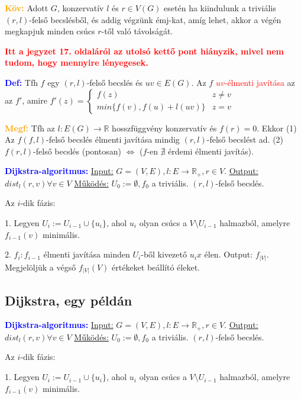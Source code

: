 \documentclass[12pt]{article}
\begin{document}
			\textbf{\textcolor{orange}{Köv:}} Adott $G$, konzervatív $l$ és $r \in V(G)$ esetén ha kiindulunk a triviális $(r,l)$-felső becslésből, és addig végzünk émj-kat, amíg lehet, akkor a végén megkapjuk minden csúcs $r$-től való távolságát.

			\textbf{\textcolor{red}{Itt a jegyzet 17. oldaláról az utolsó kettő pont hiányzik, mivel nem tudom, hogy mennyire lényegesek.}}

			\textbf{\textcolor{blue}{Def:}} Tfh $f$ egy $(r,l)$-felső becslés és $uv \in E(G)$. Az $f$ \textcolor{red}{$uv$-élmenti javítása} az az $f'$, amire 
			$
				f'(z) = \begin{cases}
					f(z) & z \neq v \\
					min\{f(v), f(u) + l(uv)\} & z = v
				\end{cases}
			$

			\textbf{\textcolor{orange}{Megf:}} Tfh az $l : E(G) \rightarrow \mathbb{R}$ hosszfüggvény konzervatív és $f(r) = 0$. Ekkor (1) Az $f (f,l)$-felső becslés élmenti javítása mindig $(r,l)$-felső becslést ad. (2) $f(r,l)$-felső becslés (pontosan) $\Leftrightarrow$ ($f$-en $\nexists$ érdemi élmenti javítás).

			\textbf{\textcolor{blue}{Dijkstra-algoritmus:}} \underline{Input:} $G = (V,E), l : E \rightarrow \mathbb{R}_+, r \in V$. \underline{Output:} $dist_l(r,v) \forall v \in V$ \underline{Működés:} $U_0 := \emptyset, f_0$ a triviális. $(r,l)$-felső becslés. 
			
			Az $i$-dik fázis:

			1. Legyen $U_i := U_{i-1} \cup \{u_i\}$, ahol $u_i$ olyan csúcs a $V  \setminus  U_{i-1}$ halmazból, amelyre $f_{i-1}(v)$ minimális.

			2. $f_i:f_{i-1}$ élmenti javítása minden $U_i$-ből kivezető $u_ix$ élen. Output: $f_{|V|}$. Megjelöljük a végső $f_{|V|}(V)$ értékeket beállító éleket.
			
		\subsection{Dijkstra, egy példán}

			\textbf{\textcolor{blue}{Dijkstra-algoritmus:}} \underline{Input:} $G = (V,E), l : E \rightarrow \mathbb{R}_+, r \in V$. \underline{Output:} $dist_l(r,v) \forall v \in V$ \underline{Működés:} $U_0 := \emptyset, f_0$ a triviális. $(r,l)$-felső becslés. 
				
			Az $i$-dik fázis:

			1. Legyen $U_i := U_{i-1} \cup \{u_i\}$, ahol $u_i$ olyan csúcs a $V  \setminus  U_{i-1}$ halmazból, amelyre $f_{i-1}(v)$ minimális.
\end{document}

